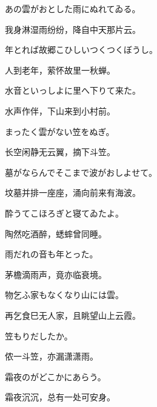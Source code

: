 \begin{haiku}
    {\FH あの雲がおとした雨にぬれてゐる。}

    {\FK 我身淋湿雨纷纷，降自中天那片云。}
\end{haiku}

\begin{haiku}
    {\FH 年とれば故郷こひしいつくつくぼうし。}

    {\FK 人到老年，萦怀故里一秋蝉。}
\end{haiku}

\begin{haiku}
    {\FH 水音といっしよに里へ下りて来た。}

    {\FK 水声作伴，下山来到小村前。}
\end{haiku}

\begin{haiku}
    {\FH まったく雲がない笠をぬぎ。}

    {\FK 长空闲静无云翼，摘下斗笠。}
\end{haiku}

\begin{haiku}
    {\FH 墓がならんでそこまで波がおしよせて。}

    {\FK 坟墓并排一座座，涌向前来有海波。}
\end{haiku}

\begin{haiku}
    {\FH 酔うてこほろぎと寝てゐたよ。}

    {\FK 陶然吃酒醉，蟋蟀曾同睡。}
\end{haiku}

\begin{haiku}
    {\FH 雨だれの音も年とった。}

    {\FK 茅檐滴雨声，竟亦临衰境。}
\end{haiku}

\begin{haiku}
    {\FH 物乞ふ家もなくなり山には雲。}

    {\FK 再乞食巳无人家，且眺望山上云霞。}
\end{haiku}

\begin{haiku}
    {\FH 笠もりだしたか。}

    {\FK 侬一斗笠，亦漏潇潇雨。}
\end{haiku}

\begin{haiku}
    {\FH 霜夜のがどこかにあらう。}

    {\FK 霜夜沉沉，总有一处可安身。}
\end{haiku}

